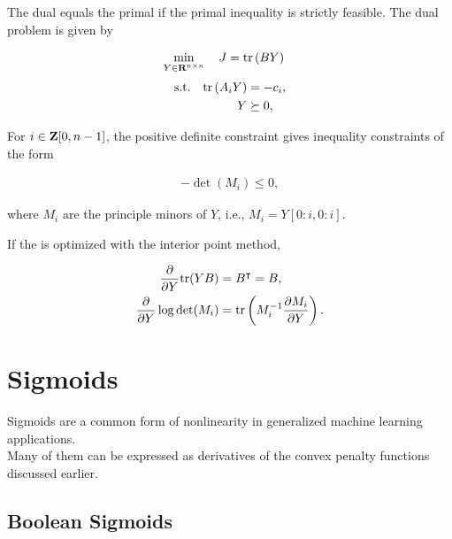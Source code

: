 \documentclass{article}
\begin{document}
The dual equals the primal if the primal inequality is strictly feasible.
The dual problem is given by 

\begin{align}
    \min_{Y\in\textbf{R}^{n\times n}}\quad J &= \text{tr}\left(BY\right)
\end{align}
\begin{align*}
    \text{s.t.}\quad \text{tr}\left(A_iY\right)&=-c_i,\\
    Y&\succeq0,
\end{align*}

For $i\in\textbf{Z}[0,n-1]$, the positive definite constraint 
gives inequality constraints of the form

\begin{align*}
    -\det(M_i)\leq 0,
\end{align*}

where $M_i$ are the principle minors of $Y$, i.e., $M_i=Y[0:i,0:i]$.

If the \SDP is optimized with the interior point method,

\begin{align*}
    \frac{\partial }{\partial Y}\text{tr}(YB)&=B^\intercal=B,\\
    \frac{\partial }{\partial Y}\log\det(M_i)&=\text{tr}\left(M_i^{-1}\frac{\partial M_i}{\partial Y}\right).
\end{align*}



\clearpage

\section{Sigmoids}
Sigmoids are a common form of nonlinearity in generalized machine learning applications.\\
Many of them can be expressed as derivatives of the convex penalty functions discussed earlier.

\subsection{Boolean Sigmoids}
\end{document}
